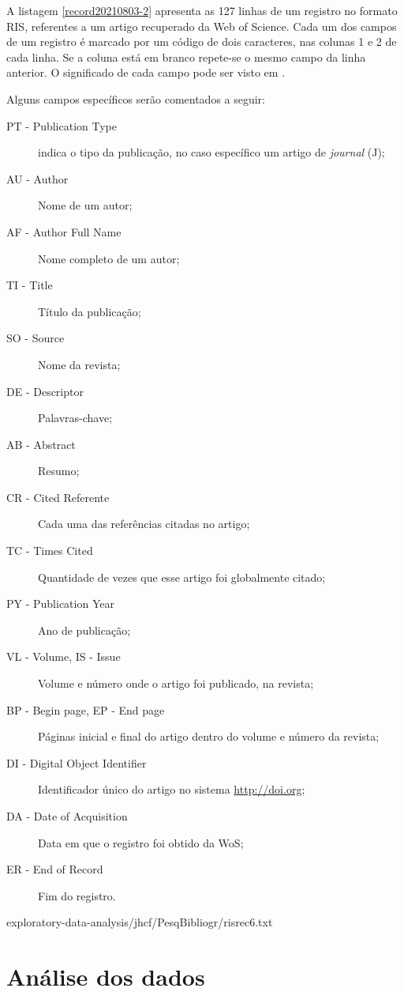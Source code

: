 A listagem \ref{record20210803-2} apresenta as 127 linhas de um registro no formato RIS, referentes a um artigo recuperado da Web of Science. Cada um dos campos de um registro é marcado por um código de dois caracteres, nas colunas 1 e 2 de cada linha. Se a coluna está em branco repete-se o mesmo campo da linha anterior.
O significado de cada campo pode ser visto em \citep{wikipedia_ris_2017}.

Alguns campos específicos serão comentados a seguir:
\begin{description}
    \item [PT - Publication Type] indica o tipo da publicação, no caso específico um artigo de \textit{journal} (J);
    \item [AU - Author] Nome de um autor;
    \item [AF - Author Full Name] Nome completo de um autor;
    \item [TI - Title] Título da publicação;
    \item [SO - Source] Nome da revista;
    \item [DE - Descriptor] Palavras-chave;
    \item [AB - Abstract] Resumo;
    \item [CR - Cited Referente] Cada uma das referências citadas no artigo;
    \item [TC - Times Cited] Quantidade de vezes que esse artigo foi globalmente citado;
    \item [PY - Publication Year] Ano de publicação;
    \item [VL - Volume, IS - Issue] Volume e número onde o artigo foi publicado, na revista;
    \item [BP - Begin page, EP - End page] Páginas inicial e final do artigo dentro do volume e número da revista;
    \item [DI - Digital Object Identifier] Identificador único do artigo no sistema \url{http://doi.org};
    \item [DA - Date of Acquisition] Data em que o registro foi obtido da WoS;
    \item [ER - End of Record] Fim do registro.
\end{description}


{exploratory-data-analysis/jhcf/PesqBibliogr/risrec6.txt}

\section{Análise dos dados\label{MASSA@jhcf:analise}}

